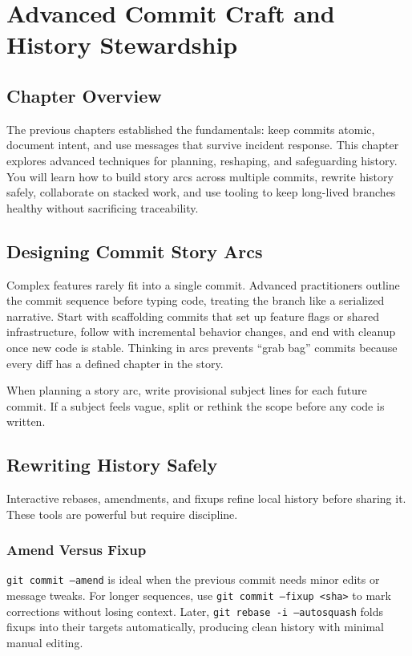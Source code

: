 \chapter{Advanced Commit Craft and History Stewardship}

\section{Chapter Overview}
The previous chapters established the fundamentals: keep commits atomic, document intent, and use messages that survive incident response. This chapter explores advanced techniques for planning, reshaping, and safeguarding history. You will learn how to build story arcs across multiple commits, rewrite history safely, collaborate on stacked work, and use tooling to keep long-lived branches healthy without sacrificing traceability.

\section{Designing Commit Story Arcs}
Complex features rarely fit into a single commit. Advanced practitioners outline the commit sequence before typing code, treating the branch like a serialized narrative. Start with scaffolding commits that set up feature flags or shared infrastructure, follow with incremental behavior changes, and end with cleanup once new code is stable. Thinking in arcs prevents ``grab bag'' commits because every diff has a defined chapter in the story.

\begin{notebox}
When planning a story arc, write provisional subject lines for each future commit. If a subject feels vague, split or rethink the scope before any code is written.
\end{notebox}

\section{Rewriting History Safely}
Interactive rebases, amendments, and fixups refine local history before sharing it. These tools are powerful but require discipline.

\subsection{Amend Versus Fixup}
\texttt{git commit --amend} is ideal when the previous commit needs minor edits or message tweaks. For longer sequences, use \texttt{git commit --fixup <sha>} to mark corrections without losing context. Later, \texttt{git rebase -i --autosquash} folds fixups into their targets automatically, producing clean history with minimal manual editing.

